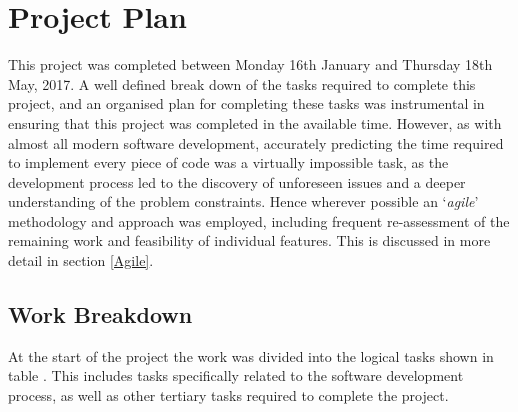 
\chapter[Project Plan]{Project Plan} %

\label{Chapter3} %


This project was completed between Monday 16th January and Thursday 18th May, 2017. A well defined break down of the tasks required to complete this project, and an organised plan for completing these tasks was instrumental in ensuring that this project was completed in the available time. However, as with almost all modern software development, accurately predicting the time required to implement every piece of code was a virtually impossible task, as the development process led to the discovery of unforeseen issues and a deeper understanding of the problem constraints. Hence wherever possible an `\textit{agile}' methodology and approach was employed, including frequent re-assessment of the remaining work and feasibility of individual features. This is discussed in more detail in section \ref{Agile}.


\section{Work Breakdown}
At the start of the project the work was divided into the logical tasks shown in table . This includes tasks specifically related to the software development process, as well as other tertiary tasks required to complete the project.

